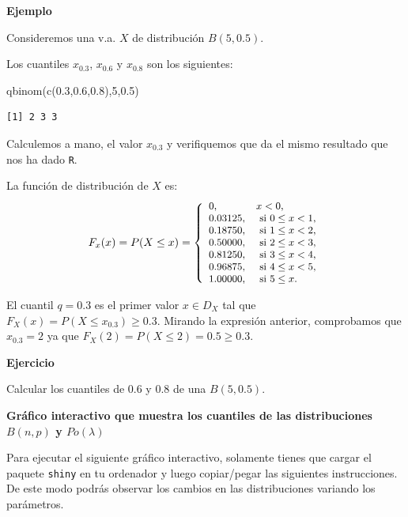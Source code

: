 \documentclass[
  letterpaper,
  DIV=11,
  numbers=noendperiod]{scrreprt}
\newenvironment{Shaded}{\begin{snugshade}}{\end{snugshade}}
\newcommand{\DecValTok}[1]{\textcolor[rgb]{0.68,0.00,0.00}{#1}}
\newcommand{\FloatTok}[1]{\textcolor[rgb]{0.68,0.00,0.00}{#1}}
\newcommand{\FunctionTok}[1]{\textcolor[rgb]{0.28,0.35,0.67}{#1}}
\newcommand{\NormalTok}[1]{\textcolor[rgb]{0.00,0.23,0.31}{#1}}
\begin{document}
\textbf{Ejemplo}

Consideremos una v.a. \(X\) de distribución \(B(5,0.5)\).

Los cuantiles \(x_{0.3}\), \(x_{0.6}\) y \(x_{0.8}\) son los siguientes:

\begin{Shaded}
\begin{Highlighting}[]
\FunctionTok{qbinom}\NormalTok{(}\FunctionTok{c}\NormalTok{(}\FloatTok{0.3}\NormalTok{,}\FloatTok{0.6}\NormalTok{,}\FloatTok{0.8}\NormalTok{),}\DecValTok{5}\NormalTok{,}\FloatTok{0.5}\NormalTok{)}
\end{Highlighting}
\end{Shaded}

\begin{verbatim}
[1] 2 3 3
\end{verbatim}

Calculemos a mano, el valor \(x_{0.3}\) y verifiquemos que da el mismo
resultado que nos ha dado \texttt{R}.

La función de distribución de \(X\) es: \[
\small{
F_x(x)=P(X\leq x)=
\left\{
\begin{array}{ll}
0, & x< 0, \\
0.03125, & \mbox{ si } 0 \leq x< 1, \\
0.18750, & \mbox{ si } 1 \leq x< 2, \\
0.50000, & \mbox{ si } 2 \leq x< 3, \\
0.81250, & \mbox{ si } 3 \leq x< 4, \\
0.96875, & \mbox{ si } 4 \leq x< 5, \\
1.00000, & \mbox{ si }  5\leq x. \\
\end{array}
\right.}
\]

El cuantil \(q=0.3\) es el primer valor \(x\in D_X\) tal que
\(F_X(x)=P(X\leq x_{0.3})\geq 0.3\). Mirando la expresión anterior,
comprobamos que \(x_{0.3}=2\) ya que \(F_X(2)=P(X\leq 2)=0.5 \geq 0.3\).

\textbf{Ejercicio}

Calcular los cuantiles de \(0.6\) y \(0.8\) de una \(B(5,0.5).\)

\textbf{Gráfico interactivo que muestra los cuantiles de las
distribuciones \(B(n,p)\) y \(Po(\lambda)\)}

Para ejecutar el siguiente gráfico interactivo, solamente tienes que
cargar el paquete \texttt{shiny} en tu ordenador y luego copiar/pegar
las siguientes instrucciones. De este modo podrás observar los cambios
en las distribuciones variando los parámetros.
\end{document}
